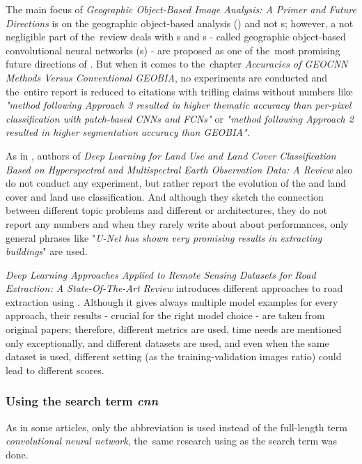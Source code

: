 The main focus of \textit{Geographic Object-Based Image Analysis: A Primer and Future Directions} is on the geographic object-based analysis () and not s; however, a not negligible part of the~review deals with s and s - called geographic object-based convolutional neural networks (s) - are proposed as one of the~most promising future directions of . But when it comes to the~chapter \textit{Accuracies of GEOCNN Methods Versus Conventional GEOBIA}, no experiments are conducted and the~entire report is reduced to citations with trifling claims without numbers like \textit{"method following Approach 3 resulted in higher thematic accuracy than per-pixel classification with patch-based CNNs and FCNs"} or \textit{"method following Approach 2 resulted in higher segmentation accuracy than GEOBIA"}.

As in \cite{review-dl-eo}, authors of \textit{Deep Learning for Land Use and Land Cover Classification Based on Hyperspectral and Multispectral Earth Observation Data: A Review} also do not conduct any experiment, but rather report the evolution of the  and land cover and land use classification. And although they sketch the connection between different topic problems and different  or  architectures, they do not report any numbers and when they rarely write about about performances, only general phrases like "\textit{U-Net has shown very promising results in extracting buildings}" are used.

\textit{Deep Learning Approaches Applied to Remote Sensing Datasets for Road Extraction: A State-Of-The-Art Review} introduces different approaches to road extraction using . Although it gives always multiple model examples for every approach, their results - crucial for the right model choice - are taken from original papers; therefore, different metrics are used, time needs are mentioned only exceptionally, and different datasets are used, and even when the same dataset is used, different setting (as the training-validation images ratio) could lead to different scores.

\subsubsection{Using the search term \textit{cnn}}
\label{wos-reviews-cnn}

As in some articles, only the abbreviation \textit{} is used instead of the full-length term \textit{convolutional neural network}, the~same research using \textit{} as the search term was done.

